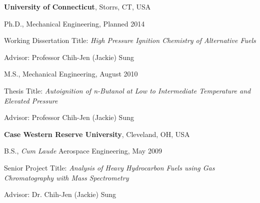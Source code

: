 \documentclass[10pt]{article}
\renewcommand{\section}[1]{\pagebreak[3]%
    \vspace{1.3\baselineskip}%
    \phantomsection\addcontentsline{toc}{section}{#1}%
    \noindent\llap{\scshape\smash{\parbox[t]{\marginparwidth}{\hyphenpenalty=10000\raggedright #1}}}%
    \vspace{-\baselineskip}\par}
\begin{document}
\textbf{University of Connecticut}, Storrs, CT, USA
\begin{outerlist}

\item[] Ph.D., Mechanical Engineering, Planned 2014
        \begin{innerlist}
        \item[] Working Dissertation Title: \emph{High Pressure Ignition Chemistry of Alternative Fuels}
        \item[] Advisor: Professor Chih-Jen (Jackie) Sung
        \end{innerlist}

\item[] M.S., Mechanical Engineering, August 2010
        \begin{innerlist}
        \item[] Thesis Title: \emph{Autoignition of n-Butanol at Low to Intermediate Temperature and Elevated Pressure}
        \item[] Advisor: Professor Chih-Jen (Jackie) Sung
        \end{innerlist}

\end{outerlist}
\vspace{0.1in}
\textbf{Case Western Reserve University}, Cleveland, OH, USA
\begin{outerlist}

\item[] B.S., \emph{Cum Laude} Aerospace Engineering, May 2009
        \begin{innerlist}
        \item[] Senior Project Title: \emph{Analysis of Heavy Hydrocarbon Fuels using Gas Chromatography with Mass Spectrometry}
        \item[] Advisor: Dr. Chih-Jen (Jackie) Sung
        \end{innerlist}

\end{outerlist}

%
\end{document}
